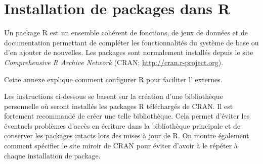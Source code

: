 \chapter{Installation de packages dans R}
\label{packages}

Un package R est un ensemble cohérent de fonctions, de jeux de données
et de documentation permettant de compléter les fonctionnalités du
système de base ou d'en ajouter de nouvelles. Les packages sont normalement
installés depuis le site \emph{Comprehensive R Archive Network} (CRAN;
\url{http://cran.r-project.org}).

Cette annexe explique comment configurer R pour faciliter l'%
externes.

Les instructions ci-dessous se basent sur la création d'une
bibliothèque personnelle où seront installés les packages R
téléchargés de CRAN. Il est fortement recommandé de créer une telle
bibliothèque. Cela permet d'éviter les éventuels problèmes d'accès en écriture
dans la bibliothèque principale et de conserver les packages intacts
lors des mises à jour de R. On montre également comment spécifier
le site miroir de CRAN pour éviter d'avoir à le répéter à chaque
installation de package.

